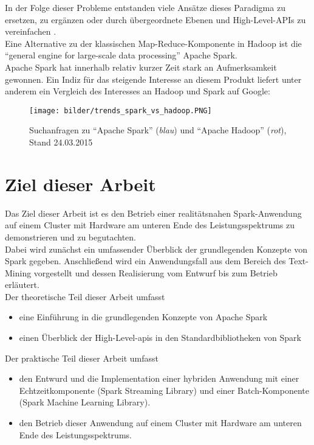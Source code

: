 In der Folge dieser Probleme entstanden viele Ansätze dieses Paradigma zu ersetzen, zu ergänzen oder durch übergeordnete Ebenen und High-Level-APIs zu vereinfachen \cite{Sin14}.\\

Eine Alternative zu der klassischen Map-Reduce-Komponente in Hadoop ist die "`general engine for large-scale data processing"' Apache Spark.\\

Apache Spark hat innerhalb relativ kurzer Zeit stark an Aufmerksamkeit gewonnen. Ein Indiz für das steigende Interesse an diesem Produkt liefert unter anderem ein Vergleich des Interesses an Hadoop und Spark auf Google:\\

\begin{figure}[h]
\texttt{[image: bilder/trends\_spark\_vs\_hadoop.PNG]}
\caption[Google Trends]{Suchanfragen zu "`Apache Spark"' (\textit{blau}) und "`Apache Hadoop"' (\textit{rot}), Stand 24.03.2015 \cite{googletrends}}
\end{figure}

\section{Ziel dieser Arbeit}
Das Ziel dieser Arbeit ist es den Betrieb einer realitätsnahen Spark-Anwendung auf einem Cluster mit Hardware am unteren Ende des Leistungsspektrums zu demonstrieren und zu begutachten.\\
Dabei wird zunächst ein umfassender Überblick der grundlegenden Konzepte von Spark gegeben. Anschließend wird ein Anwendungsfall aus dem Bereich des Text-Mining vorgestellt und dessen Realisierung vom Entwurf bis zum Betrieb erläutert.\\

Der theoretische Teil dieser Arbeit umfasst
\begin{itemize}
  \item eine Einführung in die grundlegenden Konzepte von Apache Spark 
	\item einen Überblick der High-Level-\glspl{api} in den Standardbibliotheken von Spark
\end{itemize}

Der praktische Teil dieser Arbeit umfasst
\begin{itemize}
\item den Entwurd und die Implementation einer hybriden Anwendung mit einer Echtzeitkomponente (Spark Streaming Library) und einer Batch-Komponente (Spark Machine Learning Library).
\item den Betrieb dieser Anwendung auf einem Cluster mit Hardware am unteren Ende des Leistungsspektrums.
\end{itemize}


